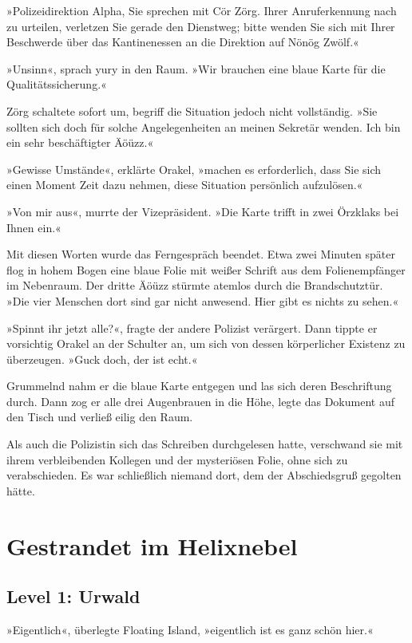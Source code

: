 »Polizeidirektion Alpha, Sie sprechen mit Cör Zörg. Ihrer Anruferkennung nach zu urteilen, verletzen Sie gerade den Dienstweg; bitte wenden Sie sich mit Ihrer Beschwerde über das Kantinenessen an die Direktion auf Nönög Zwölf.«

»Unsinn«, sprach yury in den Raum. »Wir brauchen eine blaue Karte für die Qualitätssicherung.«

Zörg schaltete sofort um, begriff die Situation jedoch nicht vollständig. »Sie sollten sich doch für solche Angelegenheiten an meinen Sekretär wenden. Ich bin ein sehr beschäftigter Äöüzz.«

»Gewisse Umstände«, erklärte Orakel, »machen es erforderlich, dass Sie sich einen Moment Zeit dazu nehmen, diese Situation persönlich aufzulösen.«

»Von mir aus«, murrte der Vizepräsident. »Die Karte trifft in zwei Örzklaks bei Ihnen ein.«

Mit diesen Worten wurde das Ferngespräch beendet. Etwa zwei Minuten später flog in hohem Bogen eine blaue Folie mit weißer Schrift aus dem Folienempfänger im Nebenraum. Der dritte Äöüzz stürmte atemlos durch die Brandschutztür. »Die vier Menschen dort sind gar nicht anwesend. Hier gibt es nichts zu sehen.«

»Spinnt ihr jetzt alle?«, fragte der andere Polizist verärgert. Dann tippte er vorsichtig Orakel an der Schulter an, um sich von dessen körperlicher Existenz zu überzeugen. »Guck doch, der ist echt.«

Grummelnd nahm er die blaue Karte entgegen und las sich deren Beschriftung durch. Dann zog er alle drei Augenbrauen in die Höhe, legte das Dokument auf den Tisch und verließ eilig den Raum.

Als auch die Polizistin sich das Schreiben durchgelesen hatte, verschwand sie mit ihrem verbleibenden Kollegen und der mysteriösen Folie, ohne sich zu verabschieden. Es war schließlich niemand dort, dem der Abschiedsgruß gegolten hätte.


\chapter{Gestrandet im Helixnebel}

\section{Level 1: Urwald}

»Eigentlich«, überlegte Floating Island, »eigentlich ist es ganz schön hier.«

